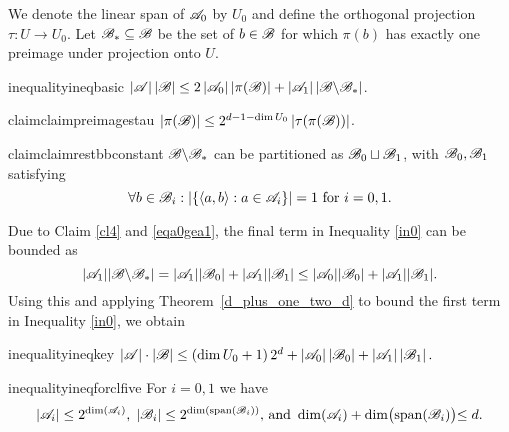 We denote the linear span of ${\mathscr{A}}_0$ by $U_0$ and define the orthogonal projection $\tau: U \rightarrow U_0$. Let ${\mathscr{B}}_* \subseteq {\mathscr{B}}$ be the set of $b \in {\mathscr{B}}$ for which $\pi(b)$ has exactly one preimage under projection onto $U$.

\begin{restatable}{inequality}{ineqbasic}\label{in0}
   $\left|{\mathscr{A}}\right|\left|{\mathscr{B}}\right| \leq 2\left|{\mathscr{A}}_0\right||\pi({\mathscr{B}})|+\left|{\mathscr{A}}_1\right|\left|{\mathscr{B}} \backslash {\mathscr{B}}_*\right|$.
\end{restatable}


\begin{restatable}{claim}{claimpreimagestau}\label{cl3}
    $\left|\pi({\mathscr{B}})\right| \leq 2^{d-1-\operatorname{dim} U_0}\left|\tau(\pi({\mathscr{B}}))\right|$.
\end{restatable}

\begin{restatable}{claim}{claimrestbbconstant}\label{cl4}
    ${\mathscr{B}} \backslash {\mathscr{B}}_* $ can be partitioned as $ {\mathscr{B}}_0 \sqcup {\mathscr{B}}_1$, with ${\mathscr{B}}_0, {\mathscr{B}}_1$ satisfying
    \[
        \forall b\in{\mathscr{B}}_i: \left|\left\{\langle a, b\rangle: a \in {\mathscr{A}}_i\right\}\right|=1\text{ for }i=0, 1.
    \]
\end{restatable}
Due to Claim \ref{cl4} and \eqref{eqa0gea1}, the final term in Inequality \ref{in0} can be bounded as \[ |{\mathscr{A}}_1||{\mathscr{B}} \backslash {\mathscr{B}}_*| = |{\mathscr{A}}_1||{\mathscr{B}}_0|+|{\mathscr{A}}_1||{\mathscr{B}}_1| \leq |{\mathscr{A}}_0||{\mathscr{B}}_0|+|{\mathscr{A}}_1||{\mathscr{B}}_1|.\] Using this and applying Theorem~\ref{d_plus_one_two_d} to bound the first term in Inequality \ref{in0}, we obtain
\begin{restatable}{inequality}{ineqkey}\label{in1}
    $\left|{\mathscr{A}}\right| \cdot\left|{\mathscr{B}}\right| \leq \left(\operatorname{dim} U_0+1\right) 2^d+\left|{\mathscr{A}}_0\right|\left|{\mathscr{B}}_0\right|+\left|{\mathscr{A}}_1\right|\left|{\mathscr{B}}_1\right|.$
\end{restatable}
\begin{restatable}{inequality}{ineqforclfive}\label{ineqForCl5}
    For $i = 0,1$ we have 
    \[
        |{\mathscr{A}}_i| \leq 2^{\operatorname{dim}({\mathscr{A}}_i)},\;|{\mathscr{B}}_i| \leq 2^{\operatorname{dim}(\operatorname{span}({\mathscr{B}}_i))} \text{, and } \operatorname{dim}({\mathscr{A}}_i) + \operatorname{dim}\bigl(\operatorname{span}({\mathscr{B}}_i)\bigl) \leq d.
    \]
\end{restatable}

